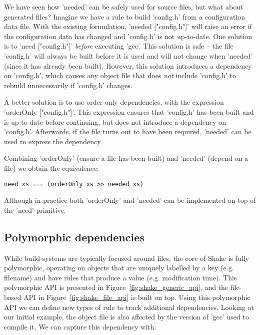 We have seen how \lst'needed' can be safely used for source files, but what about generated files? Imagine we have a rule to build \lst'config.h' from a configuration data file. With the existing formulation, \lst'needed ["config.h"]' will raise an error if the configuration data has changed and \lst'config.h' is not up-to-date. One solution is to \lst'need ["config.h"]' \emph{before} executing \lst'gcc'. This solution is safe -- the file \lst'config.h' will always be built before it is used and will not change when \lst'needed' (since it has already been built). However, this solution introduces a dependency on \lst'config.h', which causes any object file that does \emph{not} include \lst'config.h' to rebuild unnecessarily if \lst'config.h' changes.

A better solution is to use order-only dependencies, with the expression \lst'orderOnly ["config.h"]'. This expression ensures that \lst'config.h' has been built and is up-to-date before continuing, but does not introduce a dependency on \lst'config.h'. Afterwards, if the file turns out to have been required, \lst'needed' can be used to express the dependency.

Combining \lst'orderOnly' (ensure a file has been built) and \lst'needed' (depend on a file) we obtain the equivalence:

\begin{lstlisting}
need xs === (orderOnly xs >> needed xs)
\end{lstlisting}

\noindent Although in practice both \lst'orderOnly' and \lst'needed' can be implemented on top of the \lst'need' primitive.

\subsection{Polymorphic dependencies\label{sec:polymorphic}}

While build-systems are typically focused around files, the core of Shake is fully polymorphic, operating on objects that are uniquely labelled by a key (e.g. filename) and have rules that produce a value (e.g. modification time). This polymorphic API is presented in Figure~\ref{fig:shake_generic_api}, and the file-based API in Figure~\ref{fig:shake_file_api} is built on top. Using this polymorphic API we can define new types of rule to track additional dependencies. Looking at our initial example, the object file is also affected by the version of \lst'gcc' used to compile it. We can capture this dependency with:


